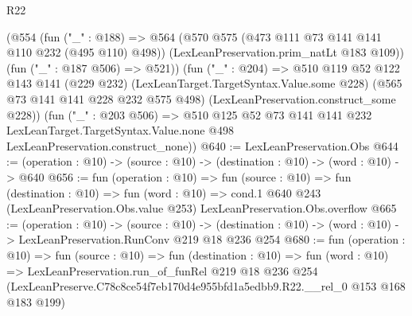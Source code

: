 \begin{lexlean}{R22}
\begin{coremodule}
      (@554
        (fun ("_" : @188) =>
        @564
          (@570 @575 (@473 @111 @73 @141 @141 @110 @232 (@495 @110) @498))
          (LexLeanPreservation.prim_natLt @183 @109))
        (fun ("_" : @187 @506) => @521))
      (fun ("_" : @204) =>
      @510
        @119
        @52
        @122
        @143
        @141
        (@229 @232)
        (LexLeanTarget.TargetSyntax.Value.some @228)
        (@565 @73 @141 @141 @228 @232 @575 @498)
        (LexLeanPreservation.construct_some @228))
      (fun ("_" : @203 @506) =>
      @510
        @125
        @52
        @73
        @141
        @141
        @232
        LexLeanTarget.TargetSyntax.Value.none
        @498
        LexLeanPreservation.construct_none))
@640 := LexLeanPreservation.Obs
@644 := (operation : @10) -> (source : @10) -> (destination : @10) -> (word : @10) -> @640
@656 := fun (operation : @10) =>
  fun (source : @10) =>
  fun (destination : @10) =>
  fun (word : @10) =>
  cond.{1} @640 @243 (LexLeanPreservation.Obs.value @253) LexLeanPreservation.Obs.overflow
@665 := (operation : @10) ->
  (source : @10) ->
  (destination : @10) -> (word : @10) -> LexLeanPreservation.RunConv @219 @18 @236 @254
@680 := fun (operation : @10) =>
  fun (source : @10) =>
  fun (destination : @10) =>
  fun (word : @10) =>
  LexLeanPreservation.run_of_funRel
    @219
    @18
    @236
    @254
    (LexLeanPreserve.C78c8ce54f7eb170d4e955bfd1a5edbb9.R22.__rel_0 @153 @168 @183 @199)
\end{coremodule}
\end{lexlean}

